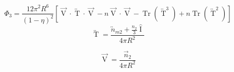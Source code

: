 \documentclass[letterpaper,twocolumn,amsmath,amssymb,prb]{revtex4-1}
\begin{document}
\begin{widetext}
\begin{equation}{\Phi_3=\frac{12\pi^2R^6}{(1-\eta)^2}\left[\overrightarrow{\operatorname{V}}\cdot\overleftrightarrow{\operatorname{T}}\cdot\overrightarrow{\operatorname{V}}-n\overrightarrow{\operatorname{V}}\cdot\overrightarrow{\operatorname{V}}-\operatorname{Tr}\left(\overleftrightarrow{\operatorname{T}}^3\right)+n\operatorname{Tr}\left(\overleftrightarrow{\operatorname{T}}^2\right)\right]}\end{equation}
\[{}\]
\begin{equation}{\overleftrightarrow{\operatorname{T}}=\frac{{\overleftrightarrow{n}_{m2}}+\frac{n_2}{3}\hat{\operatorname{I}}}{4\pi{R}^2}}\end{equation}

\begin{equation}{\overrightarrow{\operatorname{V}}=\frac{\vec{n}_2}{4\pi{R}^2}}\end{equation}


\end{widetext}
\end{document}
